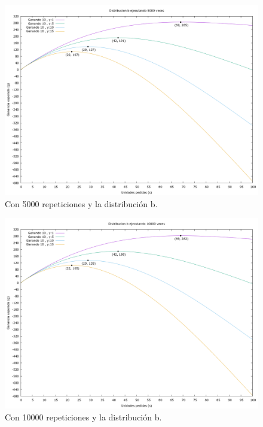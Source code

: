 \documentclass[12pt, spanish]{article}
\begin{document}
\begin{figure}[H]
	\centering
	\includegraphics[scale = 0.3]{prob_b/datos_b_5000.png}
	\caption{Con 5000 repeticiones y la distribución b.}
	\label{fig:ej1_a_5000}

\end{figure}


\begin{figure}[H]
	\centering
	\includegraphics[scale = 0.3]{prob_b/datos_b_10000.png}
	\caption{Con 10000 repeticiones y la distribución b.}
	\label{fig:ej1_a_10000}

\end{figure}
\end{document}

